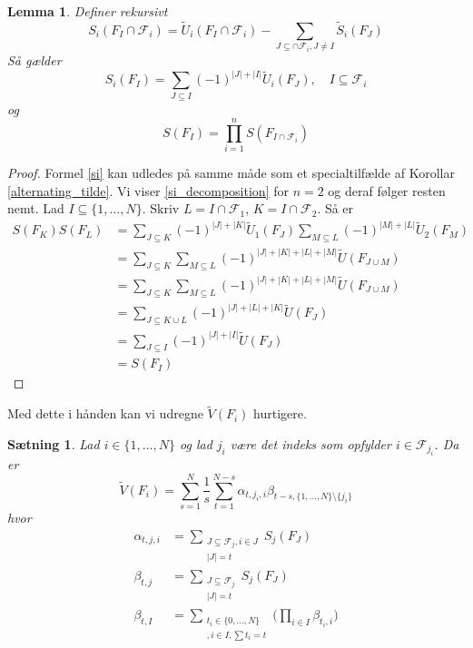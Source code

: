 \documentclass[a4paper, 12pt]{article}
\newtheorem{lemma}{Lemma}
\newtheorem{saetning}{Sætning}
\begin{document}
\begin{lemma}\label{tilde_sis}
Definer rekursivt
\begin{equation}
S_i(F_I\cap \mathcal F_i)=\tilde U_i(F_I\cap \mathcal F_i)-\sum_{J\subseteq \cap \mathcal F_i, J\neq I}\tilde S_i(F_J)
\end{equation}
Så gælder 
\begin{equation}
S_i(F_I)=\sum_{J\subseteq I}(-1)^{|J|+|I|}\tilde U_i(F_J), \quad I\subseteq \mathcal F_i\label{si}
\end{equation}
og
\begin{equation}
S(F_I)=\prod_{i=1}^n S(F_{I\cap \mathcal F_i})\label{si_decomposition}
\end{equation}
\end{lemma}
\begin{proof}
Formel \eqref{si} kan udledes på samme måde som et specialtilfælde af Korollar \ref{alternating_tilde}. Vi viser \eqref{si_decomposition} for $n=2$ og deraf følger resten nemt. Lad $I\subseteq \{1, \dots, N\}$. Skriv $L=I\cap \mathcal F_1$, $K=I\cap \mathcal F_2$. Så er
\begin{align*}
S(F_K)S(F_L)&=\sum_{J\subseteq K} (-1)^{|J|+|K|}\tilde U_1(F_J)\sum_{M\subseteq L} (-1)^{|M|+|L|}\tilde U_2(F_M)\\
&=\sum_{J\subseteq K}\sum_{M\subseteq L} (-1)^{|J|+|K|+|L|+|M|}\tilde U(F_{J\cup M})\\
&=\sum_{J\subseteq K}\sum_{M\subseteq L} (-1)^{|J|+|K|+|L|+|M|}\tilde U(F_{J\cup M})\\
&=\sum_{J\subseteq K\cup L}(-1)^{|J|+|L|+|K|}\tilde U(F_J)\\
&=\sum_{J\subseteq I}(-1)^{|J|+|I|}\tilde U(F_J)\\
&=S(F_I)
\end{align*}
\end{proof}
Med dette i hånden kan vi udregne $\tilde V(F_i)$ hurtigere.
\begin{saetning}\label{saetning_fast_computation}
Lad $i\in \{1, \dots, N\}$ og lad $j_i$ være det indeks som opfylder $i\in \mathcal F_{j_i}$. Da er
\begin{equation}
\tilde V(F_i)=\sum_{s=1}^N\frac{1}{s}\sum_{t=1}^{N-s}\alpha_{t,{j_i},i}\beta_{t-s, \{1, \dots, N\}\setminus \{j_i\}}
\end{equation}
hvor \begin{align}
\alpha_{t,j,i}&=\sum_{\substack{J\subseteq \mathcal F_j, i\in J\\ |J|=t}}S_j(F_{J})\\
\beta_{t,j}&=\sum_{\substack{J\subseteq \mathcal F_j\\ |J|=t}}S_j(F_{J})\\
\beta_{t,I}&=\sum_{\substack{t_i\in \{0, \dots, N\}\\,
i\in I, \sum t_i=t}} \Biggl(\prod_{i\in I} \beta_{t_i,i}\Biggr)
\end{align}
\end{saetning}
\end{document}
